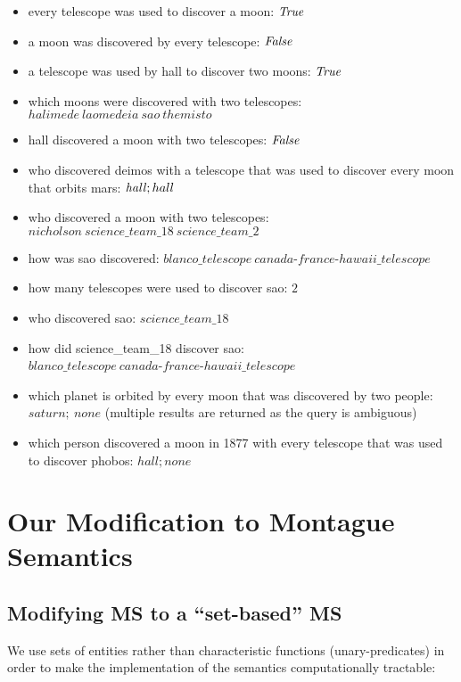 \documentclass[../main.tex]{subfiles}
\begin{document}
\begin{refsection}
\begin{itemize}
	\setlength\itemsep{0em}
	\item every telescope was used to discover a moon: $\mathit{True}$
	\item a moon was discovered by every telescope: $\mathit{False}$
	\item a telescope was used by hall to discover two moons: $\mathit{True}$
	\item which moons were discovered with two telescopes: \\$\mathit{halimede\ laomedeia\ sao\ themisto}$
	\item hall discovered a moon with two telescopes: $\mathit{False}$
	\item who discovered deimos with a telescope that was used to discover every moon that orbits mars: $\mathit{hall};hall$
	\item who discovered a moon with two telescopes: \\ $\mathit{nicholson\ science\_team\_18\ science\_team\_2}$
	\item how was sao discovered: $\mathit{blanco\_telescope\ canada}$-$\mathit{france}$-$\mathit{hawaii\_telescope}$
	\item how many telescopes were used to discover sao: $2$
	\item who discovered sao: $\mathit{science\_team\_18}$
	\item how did science\_team\_18 discover sao: \\ $\mathit{blanco\_telescope\ canada}$-$\mathit{france}$-$\mathit{hawaii\_telescope}$
	\item which planet is orbited by every moon that was discovered by two people: $\mathit{saturn;\ none}$ (multiple results are returned as the query is ambiguous)
	\item which person discovered a moon in 1877 with every telescope that was used to discover phobos: $\mathit{hall; none}$
\end{itemize}

\section{Our Modification to Montague Semantics}
\label{ext:modification}
\subsection{Modifying MS to a ``set-based'' MS}

We use sets of entities rather than characteristic functions (unary-predicates) in order to make the
implementation of the semantics computationally tractable:


\end{refsection}
\end{document}
